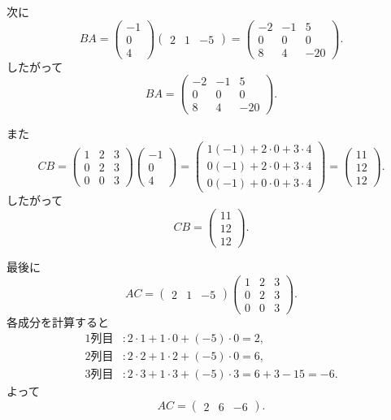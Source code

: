 \documentclass[uplatex,dvipdfmx,a4paper,14pt]{jsarticle}
\begin{document}
次に
\[
BA=
\begin{pmatrix}-1\\0\\4\end{pmatrix}
\begin{pmatrix}2&1&-5\end{pmatrix}
=
\begin{pmatrix}
-2&-1&5\\
0&0&0\\
8&4&-20
\end{pmatrix}.
\]
したがって
\[
\boxed{BA=\begin{pmatrix}-2&-1&5\\0&0&0\\8&4&-20\end{pmatrix}.}
\]

また
\[
CB=
\begin{pmatrix}1&2&3\\0&2&3\\0&0&3\end{pmatrix}
\begin{pmatrix}-1\\0\\4\end{pmatrix}
=
\begin{pmatrix}
1(-1)+2\cdot0+3\cdot4\\
0(-1)+2\cdot0+3\cdot4\\
0(-1)+0\cdot0+3\cdot4
\end{pmatrix}
=
\begin{pmatrix}11\\12\\12\end{pmatrix}.
\]
したがって
\[
\boxed{CB=\begin{pmatrix}11\\12\\12\end{pmatrix}.}
\]

最後に
\[
AC=
\begin{pmatrix}2&1&-5\end{pmatrix}
\begin{pmatrix}1&2&3\\0&2&3\\0&0&3\end{pmatrix}.
\]
各成分を計算すると
\[
\begin{aligned}
1\text{列目}&:2\cdot1+1\cdot0+(-5)\cdot0=2,\\
2\text{列目}&:2\cdot2+1\cdot2+(-5)\cdot0=6,\\
3\text{列目}&:2\cdot3+1\cdot3+(-5)\cdot3=6+3-15=-6.
\end{aligned}
\]
よって
\[
\boxed{AC=\begin{pmatrix}2&6&-6\end{pmatrix}.}
\]
\end{document}
